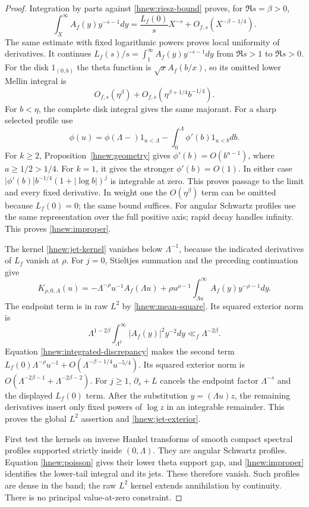 \begin{proof}
Integration by parts against \eqref{hnew:riesz-bound} proves,
for $\Re s=\beta>0$,
\begin{equation}\label{hnew:integrated-discrepancy}
 \int_X^\infty A_f(y)y^{-s-1}dy
 =\frac{L_f(0)}sX^{-s}+O_{f,s}(X^{-\beta-1/4}).
\end{equation}
The same estimate with fixed logarithmic powers proves local
uniformity of derivatives.
It continues $L_f(s)/s=\int_1^\infty A_f(y)y^{-s-1}dy$
from $\Re s>1$ to $\Re s>0$.
For the disk $1_{(0,b)}$ the theta function is
$\sqrt x A_f(b/x)$, so its omitted lower Mellin integral is
\[
 O_{f,s}(\eta^\beta)
      +O_{f,s}(\eta^{\beta+1/4}b^{-1/4}).
\]
For $b<\eta$, the complete disk integral gives the same majorant.
For a sharp selected profile use
\[
 \phi(u)=\phi(\Lambda-)1_{u<\Lambda}
                      -\int_0^\Lambda\phi'(b)1_{u<b}db.
\]
For $k\ge2$, Proposition~\ref{hnew:geometry} gives
$\phi'(b)=O(b^{a-1})$, where $a\ge1/2>1/4$.
For $k=1$, it gives the stronger $\phi'(b)=O(1)$.
In either case $|\phi'(b)|b^{-1/4}(1+|\log b|)^j$
is integrable at zero.  This proves passage to the limit and
every fixed derivative.  In weight one the $O(\eta^\beta)$
term can be omitted because $L_f(0)=0$; the same bound suffices.
For angular Schwartz profiles use the
same representation over the full positive axis; rapid decay
handles infinity.  This proves \eqref{hnew:improper}.

The kernel \eqref{hnew:jet-kernel} vanishes below $\Lambda^{-1}$,
because the indicated derivatives of $L_f$ vanish at $\rho$.
For $j=0$, Stieltjes summation and the preceding continuation give
\begin{equation}\label{hnew:tail-decomposition}
 K_{\rho,0,\Lambda}(u)
  =-\Lambda^{-\rho}u^{-1}A_f(\Lambda u)
    +\rho u^{\rho-1}\int_{\Lambda u}^\infty
                                A_f(y)y^{-\rho-1}dy.
\end{equation}
The endpoint term is in raw $L^2$ by \eqref{hnew:mean-square}.
Its squared exterior norm is
\[
 \Lambda^{1-2\beta}\int_{\Lambda^2}^\infty
                       |A_f(y)|^2y^{-2}dy\ll_f\Lambda^{-2\beta}.
\]
Equation \eqref{hnew:integrated-discrepancy} makes the second term
$L_f(0)\Lambda^{-\rho}u^{-1}
+O(\Lambda^{-\beta-1/4}u^{-5/4})$.
Its squared exterior norm is
$O(\Lambda^{-2\beta-1}+\Lambda^{-2\beta-2})$.
For $j\ge1$, $\partial_s+L$ cancels the endpoint factor
$\Lambda^{-s}$ and the displayed $L_f(0)$ term.
After the substitution $y=(\Lambda u)z$, the remaining derivatives
insert only fixed powers of $\log z$ in an integrable remainder.
This proves the global $L^2$ assertion and \eqref{hnew:jet-exterior}.

First test the kernels on inverse Hankel transforms of smooth
compact spectral profiles supported strictly inside $(0,\Lambda)$.
They are angular Schwartz profiles.  Equation \eqref{hnew:poisson}
gives their lower theta support gap, and \eqref{hnew:improper}
identifies the lower-tail integral and its jets.
These therefore vanish.  Such profiles are dense in the band;
the raw $L^2$ kernel extends annihilation by continuity.
There is no principal value-at-zero constraint.
\end{proof}

